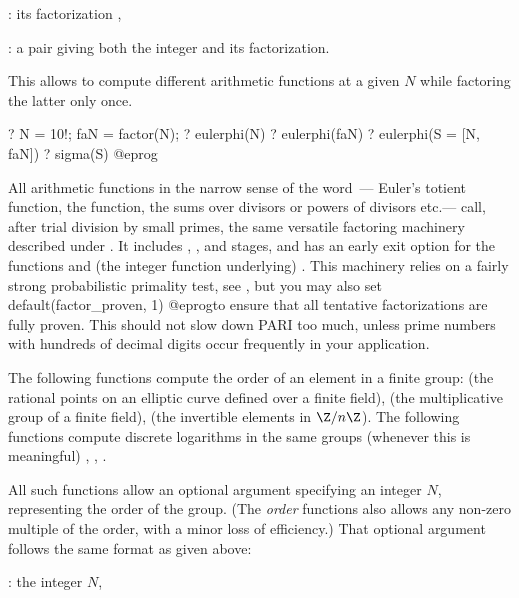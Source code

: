 \item {}: its factorization ,

\item {}: a pair \kbd{[$N$, fa]} giving both the integer and
  its factorization.

This allows to compute different arithmetic functions at a given $N$
while factoring the latter only once.

\bprog
  ? N = 10!; faN = factor(N);
  ? eulerphi(N)
  ? eulerphi(faN)
  ? eulerphi(S = [N, faN])
  ? sigma(S)
@eprog

All arithmetic functions in the narrow sense of the word~--- Euler's
totient function, the  function,
the sums over divisors or powers of divisors etc.--- call, after trial
division by small primes, the same versatile factoring machinery described
under . It includes , ,
 and  stages, and has an early exit option for the
functions  and (the integer function underlying)
. This machinery relies on a fairly strong
probabilistic primality test, see , but you may also set
\bprog
  default(factor_proven, 1)
@eprog\noindent to ensure that all tentative factorizations are fully proven.
This should not slow down PARI too much, unless prime numbers with
hundreds of decimal digits occur frequently in your application.

\label{se:DLfun}

The following functions compute the order of an element in a finite group:
 (the rational points on an elliptic curve defined over a
finite field),  (the multiplicative group of a finite field),
 (the invertible elements in $\Z/n\Z$). The following functions
compute discrete logarithms in the same groups (whenever this is meaningful)
, , .

All such functions allow an optional argument specifying an integer
$N$, representing the order of the group. (The \emph{order} functions also
allows any non-zero multiple of the order, with a minor loss of efficiency.)
That optional argument follows the same format as given above:

\item {}: the integer $N$,

